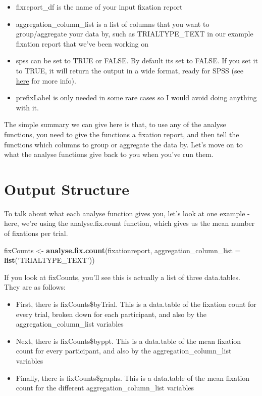 \documentclass[]{book}
\newenvironment{Shaded}{\begin{snugshade}}{\end{snugshade}}
\newcommand{\DataTypeTok}[1]{\textcolor[rgb]{0.13,0.29,0.53}{#1}}
\newcommand{\KeywordTok}[1]{\textcolor[rgb]{0.13,0.29,0.53}{\textbf{#1}}}
\newcommand{\NormalTok}[1]{#1}
\newcommand{\StringTok}[1]{\textcolor[rgb]{0.31,0.60,0.02}{#1}}
\providecommand{\tightlist}{%
  \setlength{\itemsep}{0pt}\setlength{\parskip}{0pt}}
\begin{document}
\begin{itemize}
\tightlist
\item
  fixreport\_df is the name of your input fixation report
\item
  aggregation\_column\_list is a list of columns that you want to group/aggregate your data by, such as TRIALTYPE\_TEXT in our example fixation report that we've been working on
\item
  spss can be set to TRUE or FALSE. By default its set to FALSE. If you set it to TRUE, it will return the output in a wide format, ready for SPSS (see \href{https://www.theanalysisfactor.com/wide-and-long-data/}{here} for more info).
\item
  prefixLabel is only needed in some rare cases so I would avoid doing anything with it.
\end{itemize}

The simple summary we can give here is that, to use any of the analyse functions, you need to give the functions a fixation report, and then tell the functions which columns to group or aggregate the data by. Let's move on to what the analyse functions give back to you when you've run them.

\hypertarget{output-structure}{%
\section{Output Structure}\label{output-structure}}

To talk about what each analyse function gives you, let's look at one example - here, we're using the analyse.fix.count function, which gives us the mean number of fixations per trial.

\begin{Shaded}
\begin{Highlighting}[]
\NormalTok{fixCounts <-}\StringTok{ }\KeywordTok{analyse.fix.count}\NormalTok{(fixationreport, }
                               \DataTypeTok{aggregation_column_list =} \KeywordTok{list}\NormalTok{(}\StringTok{'TRIALTYPE_TEXT'}\NormalTok{))}
\end{Highlighting}
\end{Shaded}

If you look at fixCounts, you'll see this is actually a list of three data.tables. They are as follows:

\begin{itemize}
\tightlist
\item
  First, there is fixCounts\$byTrial. This is a data.table of the fixation count for every trial, broken down for each participant, and also by the aggregation\_column\_list variables
\item
  Next, there is fixCounts\$byppt. This is a data.table of the mean fixation count for every participant, and also by the aggregation\_column\_list variables
\item
  Finally, there is fixCounts\$graphs. This is a data.table of the mean fixation count for the different aggregation\_column\_list variables
\end{itemize}
\end{document}
